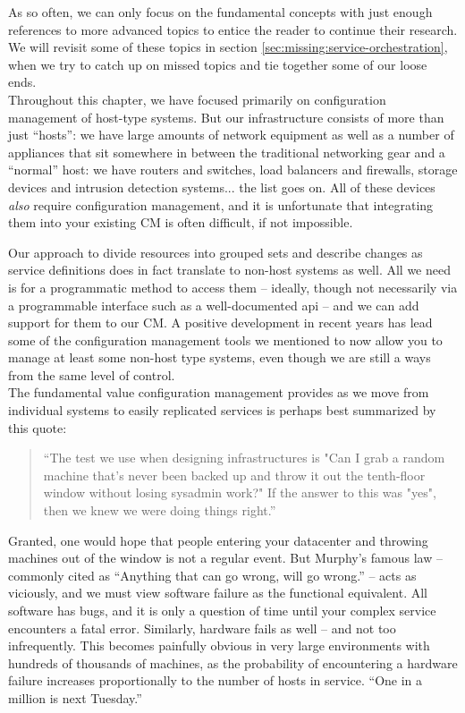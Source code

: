 As so often, we can only focus on the fundamental
concepts with just enough references to more advanced
topics to entice the reader to continue their
research. We will revisit some of these topics in
section \ref{sec:missing:service-orchestration}, when
we try to catch up on missed topics and tie together
some of our loose ends. \\

Throughout this chapter, we have focused primarily on
configuration management of host-type systems.  But
our infrastructure consists of more than just
``hosts'': we have large amounts of network
equipment as well as a number of appliances that sit
somewhere in between the traditional networking gear
and a ``normal'' host: we have routers and switches,
load balancers and firewalls, storage devices and
intrusion detection systems... the list goes on.  All
of these devices {\em also} require configuration
management, and it is unfortunate that integrating
them into your existing CM is often difficult, if not
impossible.

Our approach to divide resources into grouped sets and
describe changes as service definitions does in fact
translate to non-host systems as well.  All we need is
for a programmatic method to access them -- ideally,
though not necessarily via a programmable interface
such as a well-documented \gls{api} -- and we can add
support for them to our CM.  A positive development in
recent years has lead some of the configuration
management tools we mentioned to now allow you to
manage at least some non-host type systems, even
though we are still a ways from the same level of
control.  \\

The fundamental value configuration management provides as
we move from individual systems to easily replicated
services is perhaps best summarized by this quote:

\begin{quote}
``The test we use when designing infrastructures is "Can I grab a random
machine that's never been backed up and throw it out the tenth-floor
window without losing sysadmin work?" If the answer to this was "yes",
then we knew we were doing things
right.''\cite{configuration-management:traugott}
\end{quote}

Granted, one would hope that people entering your
datacenter and throwing machines out of the window is
not a regular event.  But Murphy's famous
law -- commonly cited as ``Anything
that can go wrong, will go wrong.'' -- acts as
viciously, and we must view software failure as the
functional equivalent.  All software has bugs, and it
is only a question of time until your complex service
encounters a fatal error.  Similarly, hardware fails
as well -- and not too infrequently.  This becomes
painfully obvious in very large environments with
hundreds of thousands of machines, as the probability
of encountering a hardware failure increases
proportionally to the number of hosts in service.
``One in a million is next
Tuesday.''\cite{configuration-management:next-tuesday}

